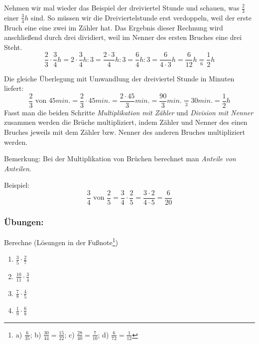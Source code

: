 Nehmen wir mal wieder das Beispiel der dreiviertel Stunde und schauen, was $\frac{2}{3}$ einer $\frac{3}{4}h$ sind. So müssen wir die Dreiviertelstunde erst verdoppeln, weil der erste Bruch eine eine zwei im Zähler hat. Das Ergebnis dieser Rechnung wird anschließend durch drei dividiert, weil im Nenner des ersten Bruches eine drei Steht.
$$\frac{2}{3}\cdot \frac{3}{4}h=2\cdot \frac{3}{4}h:3= \frac{2\cdot 3}{4}h:3=\frac{6}{4}h:3=\frac{6}{4\cdot 3}h=\frac{6}{12}h\underset{6}{=}\frac{1}{2}h$$

Die gleiche Überlegung mit Umwandlung der dreiviertel Stunde in Minuten liefert:
$$\frac{2}{3}\text{ von }45min. = \frac{2}{3}\cdot 45min. = \frac{2\cdot 45}{3}min. = \frac{90}{3} min. \underset{3}{=}30min.=\frac{1}{2}h$$
Fasst man die beiden Schritte \emph{Multiplikation mit Zähler} und \emph{Division mit Nenner} zusammen werden die Brüche multipliziert, indem Zähler und Nenner des einen Bruches jeweils mit dem Zähler bzw. Nenner des anderen Bruches multipliziert werden.


Bemerkung: Bei der Multiplikation von Brüchen berechnet man \emph{Anteile von Anteilen}.

Beispiel:
\begin{equation*} 
	\frac{3}{4}\text{ von }\frac{2}{5} = \frac{3}{4} \cdot \frac{2}{5}= \frac{3\cdot 2}{4\cdot 5}= \frac{6}{20}
\end{equation*}

\subsubsection*{Übungen:}\vspace{-1em}
Berechne (Lösungen in der Fußnote\footnote{a) $\frac{6}{35}$; b) $\frac{30}{44}=\frac{15}{22}$; c) $\frac{28}{40}=\frac{7}{10}$; d) $\frac{6}{72}=\frac{1}{12}$})
\begin{multicols}{4}
\begin{enumerate}[label=\alph*)]
	\item $\frac{3}{5} \cdot \frac{2}{7}$
	\item $\frac{10}{11} \cdot \frac{3}{4}$
	\item $\frac{7}{8} \cdot \frac{4}{5}$
	\item $\frac{1}{9} \cdot \frac{6}{8}$
\end{enumerate}
\end{multicols}

